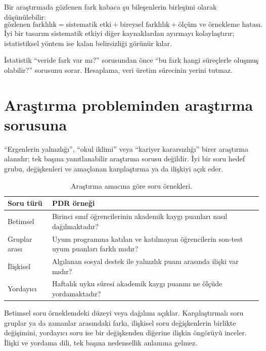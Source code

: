 Bir araştırmada gözlenen fark kabaca şu bileşenlerin birleşimi olarak
düşünülebilir:
\[
\text{gözlenen farklılık}
=\text{sistematik etki}+\text{bireysel farklılık}+\text{ölçüm ve örnekleme hatası}.
\]
İyi bir tasarım sistematik etkiyi diğer kaynaklardan ayırmayı kolaylaştırır;
istatistiksel yöntem ise kalan belirsizliği görünür kılar.

\begin{sezgibox}
İstatistik ``veride fark var mı?'' sorusundan önce ``bu fark hangi süreçlerle
oluşmuş olabilir?'' sorusunu sorar. Hesaplama, veri üretim sürecinin yerini
tutmaz.
\end{sezgibox}

\section{Araştırma probleminden araştırma sorusuna}

``Ergenlerin yalnızlığı'', ``okul iklimi'' veya ``kariyer kararsızlığı'' birer
araştırma alanıdır; tek başına yanıtlanabilir araştırma sorusu değildir.
İyi bir soru hedef grubu, değişkenleri ve amaçlanan karşılaştırma ya da ilişkiyi
açık eder.

\begin{table}[htbp]
\centering
\caption{Araştırma amacına göre soru örnekleri.}
\begin{tabular}{@{}p{}p{}@{}}
\toprule
Soru türü & PDR örneği \\
\midrule
Betimsel & Birinci sınıf öğrencilerinin akademik kaygı puanları nasıl dağılmaktadır? \\
Gruplar arası & Uyum programına katılan ve katılmayan öğrencilerin son-test uyum puanları farklı mıdır? \\
İlişkisel & Algılanan sosyal destek ile yalnızlık puanı arasında ilişki var mıdır? \\
Yordayıcı & Haftalık uyku süresi akademik kaygı puanını ne ölçüde yordamaktadır? \\
\bottomrule
\end{tabular}
\end{table}

Betimsel soru örneklemdeki düzeyi veya dağılımı açıklar. Karşılaştırmalı soru
gruplar ya da zamanlar arasındaki farkı, ilişkisel soru değişkenlerin birlikte
değişimini, yordayıcı soru ise bir değişkenden diğerine ilişkin öngörüyü
inceler. İlişki ve yordama dili, tek başına nedensellik anlamına gelmez.

